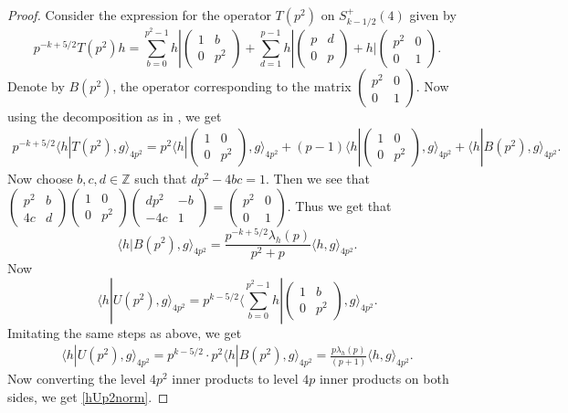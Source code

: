 \documentclass[11pt]{amsart}
\numberwithin{equation}{section}
\theoremstyle{plain}
\theoremstyle{definition}
\newcommand{\mbb}{\mathbb}
\newcommand{\lan}{\langle }
\newcommand{\ran}{\rangle}
\newcommand{\smat}[4]{\left( \begin{smallmatrix}#1&#2\\#3&#4\end{smallmatrix}\right)}
\begin{document}
\begin{proof}
Consider the expression for the operator $T(p^2)$ on $S_{k-1/2}^+(4)$ given by 
\begin{equation}
    p^{-k+5/2}T(p^2)h= \sum_{b=0}^{p^2-1}h|\smat{1}{b}{0}{p^2}+\sum_{d=1}^{p-1} h|\smat{p}{d}{0}{p}+ h|\smat{p^2}{0}{0}{1}.
\end{equation}
Denote by $B(p^2)$, the operator corresponding to the matrix $\smat{p^2}{0}{0}{1}$. Now using the decomposition as in \cite[pp. 451]{shimura}, we get
\begin{equation}
    \begin{split}
      p^{-k+5/2}\lan h|T(p^2) , g\ran_{4p^2} = p^2\lan h|\smat{1}{0}{0}{p^2}, g\ran_{4p^2}+ (p-1)\lan h|\smat{1}{0}{0}{p^2}, g\ran_{4p^2} + \lan h|B(p^2), g\ran_{4p^2}.
    \end{split}
\end{equation}
Now choose $b,c,d \in \mbb Z$ such that $dp^2-4bc=1$. Then we see that $\smat{p^2}{b}{4c}{d}\smat{1}{0}{0}{p^2}\smat{dp^2}{-b}{-4c}{1}=\smat{p^2}{0}{0}{1}$. Thus we get that
\begin{equation}
    \lan h|B(p^2), g\ran_{4p^2}= \frac{p^{-k+5/2}\lambda_h(p)}{p^2+p}\lan h , g\ran_{4p^2}.
\end{equation}
Now 
\begin{equation}
    \lan h|U(p^2) , g\ran_{4p^2}= p^{k-5/2}\lan\sum_{b=0}^{p^2-1}h|\smat{1}{b}{0}{p^2}, g \ran_{4p^2}.
\end{equation}
Imitating the same steps as above, we get
\begin{equation} \label{up2}
    \begin{split}
        \lan h|U(p^2) , g\ran_{4p^2}=  p^{k-5/2}\cdot p^2 \lan h|B(p^2), g\ran_{4p^2}= \frac{p\lambda_h(p)}{(p+1)}\lan h, g\ran_{4p^2}.
    \end{split}
\end{equation}
Now converting the level $4p^2$ inner products to level $4p$ inner products on both sides, we get \eqref{hUp2norm}.\qedhere
\end{proof}
\end{document}

